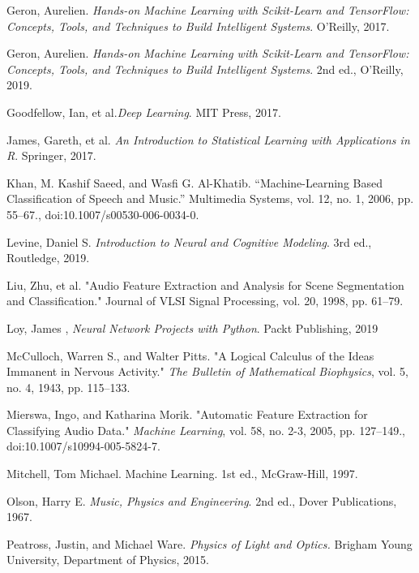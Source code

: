 \documentclass[12pt,letterpaper]{article}
\begin{document}
\begin{thebibliography}{9}


Geron, Aurelien. \textit{Hands-on Machine Learning with Scikit-Learn and TensorFlow: Concepts, Tools, and Techniques to Build Intelligent Systems}. O'Reilly, 2017.

Geron, Aurelien. \textit{Hands-on Machine Learning with Scikit-Learn and TensorFlow: Concepts, Tools, and Techniques to Build Intelligent Systems}. 2nd ed., O'Reilly, 2019.

Goodfellow, Ian, et al.\textit{Deep Learning}. MIT Press, 2017.

James, Gareth, et al. \textit{An Introduction to Statistical Learning with Applications in R}. Springer, 2017.

Khan, M. Kashif Saeed, and Wasfi G. Al-Khatib. “Machine-Learning Based Classification of Speech and Music.” Multimedia Systems, vol. 12, no. 1, 2006, pp. 55–67., doi:10.1007/s00530-006-0034-0.

Levine, Daniel S. \textit{Introduction to Neural and Cognitive Modeling}. 3rd ed., Routledge, 2019.

Liu, Zhu, et al. "Audio Feature Extraction and Analysis for Scene Segmentation and Classification." Journal of VLSI Signal Processing, vol. 20, 1998, pp. 61–79.

Loy, James , \textit{Neural Network Projects with Python}. Packt Publishing, 2019

McCulloch, Warren S., and Walter Pitts. "A Logical Calculus of the Ideas Immanent in Nervous Activity." \textit{The Bulletin of Mathematical Biophysics}, vol. 5, no. 4, 1943, pp. 115–133.

Mierswa, Ingo, and Katharina Morik. "Automatic Feature Extraction for Classifying Audio Data." \textit{Machine Learning}, vol. 58, no. 2-3, 2005, pp. 127–149., doi:10.1007/s10994-005-5824-7.

Mitchell, Tom Michael. Machine Learning. 1st ed., McGraw-Hill, 1997.

Olson, Harry E. \textit{Music, Physics and Engineering}. 2nd ed., Dover Publications, 1967.

Peatross, Justin, and Michael Ware. \textit{Physics of Light and Optics.} Brigham Young University, Department of Physics, 2015.


\end{thebibliography}
\end{document}
